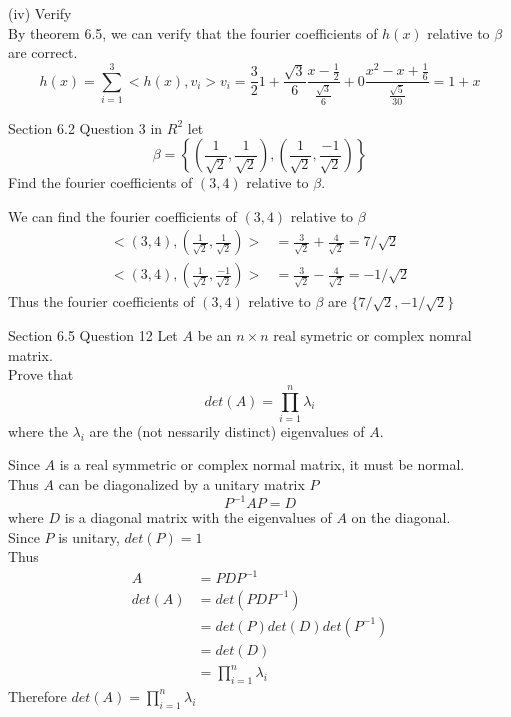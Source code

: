 \documentclass[answers,12pt,addpoints]{exam}
\begin{document}
\begin{questions}
\begin{solution}
        (iv) Verify\\
        By theorem 6.5, we can verify that the fourier coefficients of $h(x)$ relative to $\beta$ are correct.\\
        $$ h(x) = \sum_{i=1}^{3} <h(x),v_i>v_i = \frac{3}{2}1 + \frac{\sqrt{3}}{6}\frac{x-\frac{1}{2}}{\frac{\sqrt{3}}{6}} + 0\frac{x^2-x+\frac{1}{6}}{\frac{\sqrt{5}}{30}} = 1+x$$
    \end{solution}


    \question Section 6.2 Question 3
    in $R^2$ let 
    $$ \beta = \left\{\left(\frac{1}{\sqrt{2}}, \frac{1}{\sqrt{2}}\right), \left(\frac{1}{\sqrt{2}}, \frac{-1}{\sqrt{2}}\right)\right\}$$
    Find the fourier coefficients of $(3,4)$ relative to $\beta$.

    \begin{solution}
        We can find the fourier coefficients of $(3,4)$ relative to $\beta$\\
        \begin{align*}
            <(3,4),\left(\frac{1}{\sqrt{2}}, \frac{1}{\sqrt{2}}\right)> &= \frac{3}{\sqrt{2}} + \frac{4}{\sqrt{2}} = 7/\sqrt{2}\\
            <(3,4),\left(\frac{1}{\sqrt{2}}, \frac{-1}{\sqrt{2}}\right)> &= \frac{3}{\sqrt{2}} - \frac{4}{\sqrt{2}} = -1/\sqrt{2}
        \end{align*}
        Thus the fourier coefficients of $(3,4)$ relative to $\beta$ are $\{7/\sqrt{2},-1/\sqrt{2}\}$
    \end{solution}

    \question Section 6.5 Question 12
    Let $A$ be an $n \times n$ real symetric or complex nomral matrix.\\
    Prove that 
    $$ det(A) = \prod_{i=1}^{n}\lambda_i$$
    where the $\lambda_i$ are the (not nessarily distinct) eigenvalues of $A$.

    \begin{solution}
        Since $A$ is a real symmetric or complex normal matrix, it must be normal. \\
        Thus $A$ can be diagonalized by a unitary matrix $P$\\
        $$ P^{-1}AP = D$$
        where $D$ is a diagonal matrix with the eigenvalues of $A$ on the diagonal.\\
        Since $P$ is unitary, $det(P) = 1$\\
        Thus
        \begin{align*}
            A &= PDP^{-1}\\
            det(A) &= det(PDP^{-1}) \\
            &= det(P)det(D)det(P^{-1})\\
            &= det(D)\\
            &= \prod_{i=1}^{n}\lambda_i
        \end{align*}
        Therefore $det(A) = \prod_{i=1}^{n}\lambda_i$
    \end{solution}


\end{questions}
\end{document}
